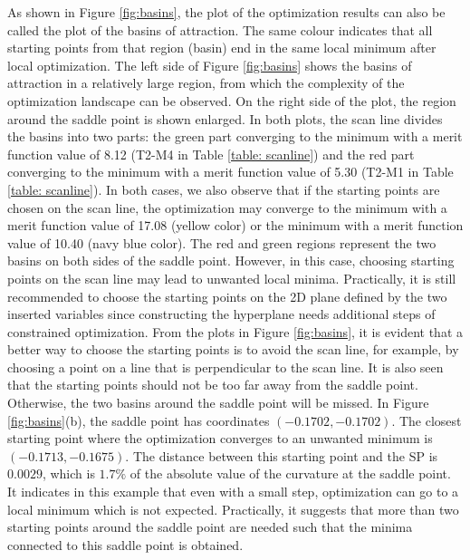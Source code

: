 As shown in Figure \ref{fig:basins}, the plot of the optimization results can also be called the plot of the basins of attraction. The same colour indicates that all starting points from that region (basin) end in the same local minimum after local optimization. The left side of Figure \ref{fig:basins} shows the basins of attraction in a relatively large region, from which the complexity of the optimization landscape can be observed. On the right side of the plot, the region around the saddle point is shown enlarged. In both plots, the scan line divides the basins into two parts: the green part converging to the minimum with a merit function value of 8.12 (T2-M4 in Table \ref{table: scanline}) and the red part converging to the minimum with a merit function value of 5.30 (T2-M1 in Table \ref{table: scanline}). In both cases, we also observe that if the starting points are chosen on the scan line, the optimization may converge to the minimum with a merit function value of 17.08 (yellow color) or the minimum with a merit function value of 10.40 (navy blue color). The red and green regions represent the two basins on both sides of the saddle point. However, in this case, choosing starting points on the scan line may lead to unwanted local minima. Practically, it is still recommended to choose the starting points on the 2D plane defined by the two inserted variables since constructing the hyperplane needs additional steps of constrained optimization. From the plots in Figure \ref{fig:basins}, it is evident that a better way to choose the starting points is to avoid the scan line, for example, by choosing a point on a line that is perpendicular to the scan line. It is also seen that the starting points should not be too far away from the saddle point. Otherwise, the two basins around the saddle point will be missed. In Figure \ref{fig:basins}(b), the saddle point has coordinates $(-0.1702,-0.1702)$. The closest starting point where the optimization converges to an unwanted minimum is $(-0.1713, -0.1675)$. The distance between this starting point and the SP is $0.0029$, which is $1.7\%$ of the absolute value of the curvature at the saddle point. It indicates in this example that even with a small step, optimization can go to a local minimum which is not expected. Practically, it suggests that more than two starting points around the saddle point are needed such that the minima connected to this saddle point is obtained. 

